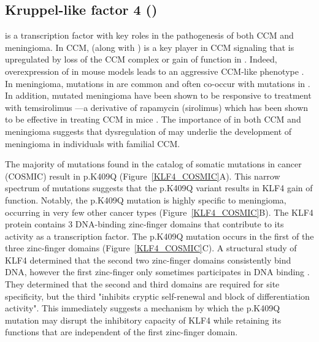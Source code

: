 \subsection{Kruppel-like factor 4 ()}
 is a transcription factor with key roles in the pathogenesis of both CCM and meningioma. In CCM,  (along with ) is a key player in CCM signaling that is upregulated by loss of the CCM complex or gain of function in  \citep{cuttano2016, zhou2016}. Indeed, overexpression of  in mouse models leads to an aggressive CCM-like phenotype \citep{ren2021}. In meningioma, mutations in  are common and often co-occur with mutations in  \citep{reuss2013}. In addition,  mutated meningioma have been shown to be responsive to treatment with temsirolimus \citep{vonSpreckelsen2020}—a derivative of rapamycin (sirolimus) which has been shown to be effective in treating CCM in mice \citep{ren2021}. The importance of  in both CCM and meningioma suggests that dysregulation of  may underlie the development of meningioma in individuals with familial CCM. 

The majority of  mutations found in the catalog of somatic mutations in cancer (COSMIC) result in p.K409Q (Figure~\ref{KLF4_COSMIC}A). This narrow spectrum of mutations suggests that the p.K409Q variant results in KLF4 gain of function. Notably, the p.K409Q mutation is highly specific to meningioma, occurring in very few other cancer types (Figure~\ref{KLF4_COSMIC}B). The KLF4 protein contains 3 DNA-binding zinc-finger domains that contribute to its activity as a transcription factor. The p.K409Q mutation occurs in the first of the three zinc-finger domains (Figure~\ref{KLF4_COSMIC}C). A structural study of KLF4 determined that the second two zinc-finger domains consistently bind DNA, however the first zinc-finger only sometimes participates in DNA binding \citep{schuetz2011}. They determined that the second and third domains are required for site specificity, but the third "inhibits cryptic self-renewal and block of differentiation activity". This immediately suggests a mechanism by which the p.K409Q mutation may disrupt the inhibitory capacity of KLF4 while retaining its functions that are independent of the first zinc-finger domain. 

